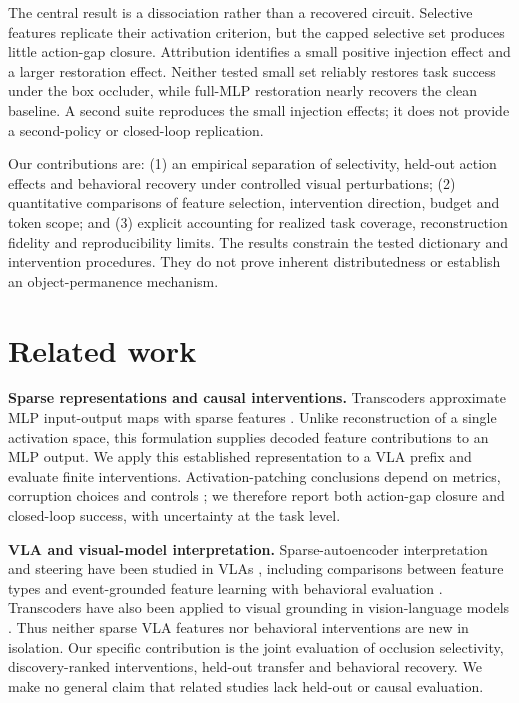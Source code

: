 \documentclass{article}
\begin{document}
The central result is a dissociation rather than a recovered circuit. Selective features replicate their activation criterion, but the capped selective set produces little action-gap closure. Attribution identifies a small positive injection effect and a larger restoration effect. Neither tested small set reliably restores task success under the box occluder, while full-MLP restoration nearly recovers the clean baseline. A second suite reproduces the small injection effects; it does not provide a second-policy or closed-loop replication.

Our contributions are: (1) an empirical separation of selectivity, held-out action effects and behavioral recovery under controlled visual perturbations; (2) quantitative comparisons of feature selection, intervention direction, budget and token scope; and (3) explicit accounting for realized task coverage, reconstruction fidelity and reproducibility limits. The results constrain the tested dictionary and intervention procedures. They do not prove inherent distributedness or establish an object-permanence mechanism.

\section{Related work}
\textbf{Sparse representations and causal interventions.} Transcoders approximate MLP input-output maps with sparse features \citep{dunefsky2024transcoders}. Unlike reconstruction of a single activation space, this formulation supplies decoded feature contributions to an MLP output. We apply this established representation to a VLA prefix and evaluate finite interventions. Activation-patching conclusions depend on metrics, corruption choices and controls \citep{zhang2024towards}; we therefore report both action-gap closure and closed-loop success, with uncertainty at the task level.

\textbf{VLA and visual-model interpretation.} Sparse-autoencoder interpretation and steering have been studied in VLAs \citep{swann2026sparse}, including comparisons between feature types \citep{grant2026features} and event-grounded feature learning with behavioral evaluation \citep{jin2026event}. Transcoders have also been applied to visual grounding in vision-language models \citep{damianos2026transcoders}. Thus neither sparse VLA features nor behavioral interventions are new in isolation. Our specific contribution is the joint evaluation of occlusion selectivity, discovery-ranked interventions, held-out transfer and behavioral recovery. We make no general claim that related studies lack held-out or causal evaluation.
\end{document}
